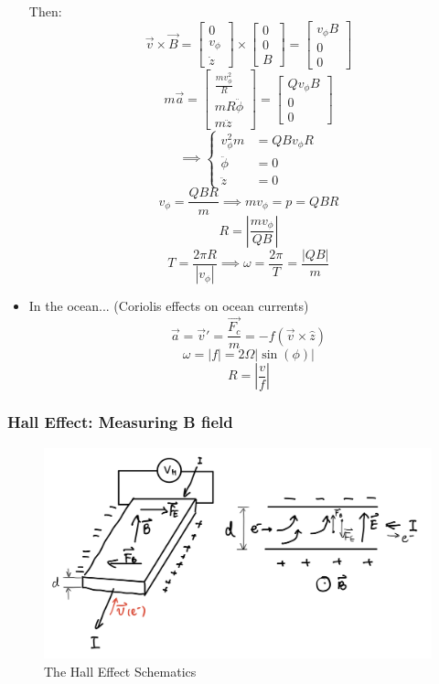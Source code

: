 \documentclass[12pt,a4paper,twoside]{article}
\begin{document}
\begin{itemize}
        Then:
        \[\overrightarrow{v}\times\overrightarrow{B}=\begin{bmatrix}0\\v_\phi  \\ \dot{z}\end{bmatrix}\times \begin{bmatrix}0\\0  \\B \end{bmatrix}=\begin{bmatrix}v_\phi B\\0  \\0 \end{bmatrix}\]
        \[\renewcommand\arraystretch{1.5}
        m\overrightarrow{a}=\begin{bmatrix}\frac{mv_\phi^2}{R}\\mR\ddot{\phi}  \\ m\ddot{z}\end{bmatrix}
        =\begin{bmatrix}Qv_\phi B\\0 \\0 \end{bmatrix}\]
        \[\implies
        \begin{cases}
            v_\phi^2m &= QBv_\phi R\\
            \ddot{\phi} &= 0\\
            \ddot{z} &= 0
        \end{cases}
        \]
        \[v_\phi = \frac{QBR}{m}\implies mv_\phi = p =QBR\]
        \[R = \left | \frac{mv_\phi}{QB} \right |\]
        \[T=\frac{2\pi R}{|v_\phi|}\implies \omega=\frac{2\pi}{T}=\frac{|QB|}{m}\]
        
    \item In the ocean... (Coriolis effects on ocean currents)
    \[\overrightarrow{a}=\overrightarrow{v}'=\frac{\overrightarrow{F_c}}{m}=-f(\overrightarrow{v}\times \hat{z})\]
    \[\omega = |f|=2\Omega|\sin(\phi)|\]
    \[R=\left|\frac{v}{f}\right|\]
    \end{itemize}
    \newpage
    
\subsubsection{Hall Effect: Measuring B field}
    \begin{figure}[ht]
        \centering
        \includegraphics[width=12cm]{250-Revision/hall.png}
        \caption{The Hall Effect Schematics}
        \label{fig:hall-effect}
    \end{figure}
    
\end{document}
